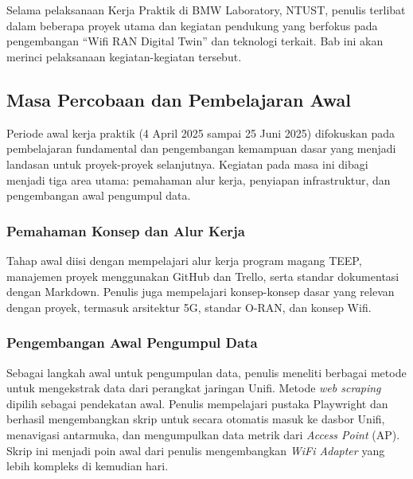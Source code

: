 \chapter{\babEmpat}
Selama pelaksanaan Kerja Praktik di BMW Laboratory, NTUST, penulis terlibat dalam beberapa proyek utama dan kegiatan pendukung yang berfokus pada pengembangan ``Wifi RAN Digital Twin'' dan teknologi terkait. Bab ini akan merinci pelaksanaan kegiatan-kegiatan tersebut.

\section{Masa Percobaan dan Pembelajaran Awal}
Periode awal kerja praktik (4 April 2025 sampai 25 Juni 2025) difokuskan pada pembelajaran fundamental dan pengembangan kemampuan dasar yang menjadi landasan untuk proyek-proyek selanjutnya. Kegiatan pada masa ini dibagi menjadi tiga area utama: pemahaman alur kerja, penyiapan infrastruktur, dan pengembangan awal pengumpul data.
\subsection{Pemahaman Konsep dan Alur Kerja}
Tahap awal diisi dengan mempelajari alur kerja program magang TEEP, manajemen proyek menggunakan GitHub dan Trello, serta standar dokumentasi dengan Markdown. Penulis juga mempelajari konsep-konsep dasar yang relevan dengan proyek, termasuk arsitektur 5G, standar O-RAN, dan konsep Wifi.

\subsection{Pengembangan Awal Pengumpul Data}
Sebagai langkah awal untuk pengumpulan data, penulis meneliti berbagai metode untuk mengekstrak data dari perangkat jaringan Unifi. Metode \textit{web scraping} dipilih sebagai pendekatan awal. Penulis mempelajari pustaka Playwright dan berhasil mengembangkan skrip untuk secara otomatis masuk ke dasbor Unifi, menavigasi antarmuka, dan mengumpulkan data metrik dari \textit{Access Point} (AP). Skrip ini menjadi poin awal dari penulis mengembangkan \textit{WiFi Adapter} yang lebih kompleks di kemudian hari.

